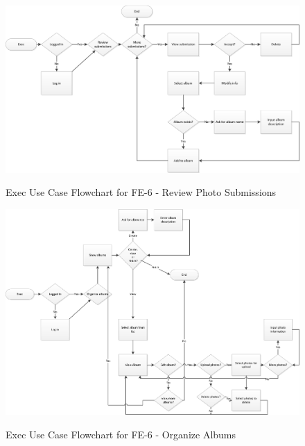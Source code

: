 \documentclass{article}
\begin{document}
\FloatBarrier
\begin{figure}
\centering
\caption{Exec Use Case Flowchart for FE-6 - Review Photo Submissions}
\includegraphics[scale=.75]{img/execUseCaseFE6_review.png}
\label{fig:execUseCaseFE6_review}
\end{figure}
\FloatBarrier

\newpage

\newpage

\FloatBarrier
\begin{figure}
\centering
\caption{Exec Use Case Flowchart for FE-6 - Organize Albums}
\includegraphics[scale=.75]{img/execUseCaseFE6_organize.png}
\label{fig:execUseCaseFE6_organize}
\end{figure}
\FloatBarrier

\newpage

\newpage
\end{document}
